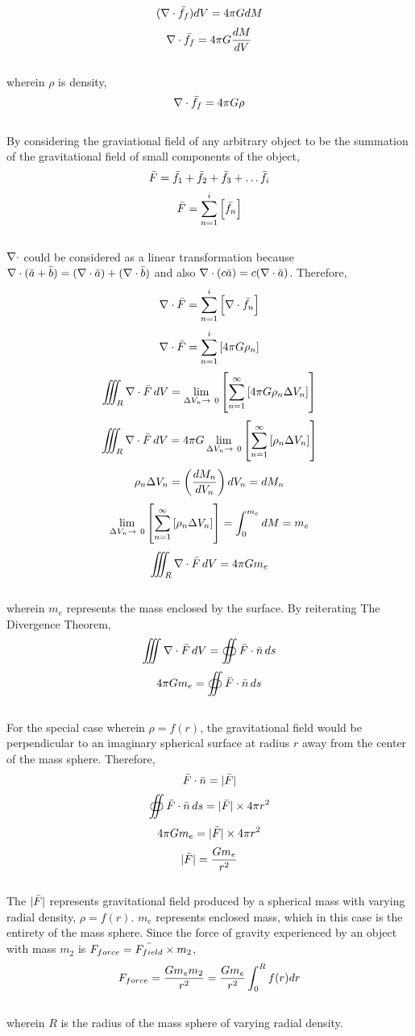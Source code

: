 \documentclass[a4paper, 12pt]{report}
\begin{document}
\begin{center}
$$(\nabla \cdot \bar{f_f})dV =  4 \pi G dM$$
$$\nabla \cdot \bar{f_f}=  4 \pi G \frac{dM}{dV}$$
\\wherein $\rho$ is density,
$$\nabla \cdot \bar{f_f}=  4 \pi G \rho$$
\\By considering the graviational field of any arbitrary object to be the summation of the gravitational field of small components of the object,
$$\bar{F} = \bar{f_1} + \bar{f_2} + \bar{f_3} + \dots  \bar{f_i}$$
$$\bar{F} = \sum_{n = 1}^{i} \left[\bar{f_n} \right]$$
\\$\nabla \cdot$ could be considered as a linear transformation because $\nabla \cdot (\bar{a} + \bar{b}) = (\nabla \cdot \bar{a}) + (\nabla \cdot \bar{b})$ and also $\nabla \cdot (c\bar{a}) =c  (\nabla \cdot \bar{a})$. Therefore,
$$\nabla \cdot \bar{F} = \sum_{n = 1}^{i} \left[\nabla \cdot \bar{f_n} \right]$$
$$\nabla \cdot \bar{F} = \sum_{n = 1}^{i} \left[4\pi G \rho_n \right]$$
$$\iiint_R \n \d \b{F} \,dV =\lim_{{\Delta V_n}\to\ 0}\l[ \sum_{n = 1}^{\infty} \l[4\pi G \rho_n\Delta V_n \r]\r]$$
$$\iiint_R \nabla \cdot \bar{F} \,dV =4\pi G\lim_{{\Delta V_n}\to\ 0}\left[ \sum_{n = 1}^{\infty} \left[ \rho_n\Delta V_n \right]\right]$$
$$\rho_n \Delta V_n =\left(\frac{dM_n}{dV_n}\right)dV_n = dM_n$$
$$\lim_{{\Delta V_n}\to\ 0}\left[ \sum_{n = 1}^{\infty} \left[ \rho_n\Delta V_n \right]\right] = \int_{0}^{m_{e}} dM = m_{e}$$
$$\iiint_R \nabla \cdot \bar{F} \,dV =4\pi Gm_e$$
\\wherein $m_e$ represents the mass enclosed by the surface. By reiterating The Divergence Theorem,
$$\displaystyle{\iiint \nabla\cdot\bar{F} \,dV =  \oiint {\bar{F} \cdot\bar{n}}\,ds }$$
$$4\pi Gm_e = \oiint {\bar{F} \cdot\bar{n} \, ds }$$
\\For the special case wherein $\rho = f(r)$, the gravitational field would be perpendicular to an imaginary spherical surface at radius $r$ away from the center of the mass sphere. Therefore,
$$\bar{F} \cdot \bar{n} = |\bar{F}|$$
$$\oiint {\bar{F} \cdot\bar{n}}\,ds = |\bar{F}| \times 4 \pi r^2$$
$$4 \pi G m_e = |\bar{F}| \times 4 \pi r^2$$
$$ |\bar{F}| = \frac{G m_e}{r^2} $$
\\The $|\bar{F}|$ represents gravitational field produced by a spherical mass with varying radial density, $\rho = f(r)$. $m_e$ represents enclosed mass, which in this case is the entirety of the mass sphere. Since the force of gravity experienced by an object with mass $m_2$ is $F_{force} = \bar{F_{field}} \times m_2$,
$$F_{force} = \frac{Gm_em_2}{r^2} = \frac{Gm_e}{r^2}\int_{0}^{R} f(r) dr$$
\\wherein $R$ is the radius of the mass sphere of varying radial density.
\end{center}
\end{document}
